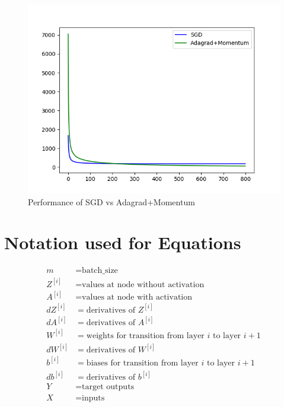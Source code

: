 \documentclass{article}
\begin{document}
\begin{figure}[H]
	\includegraphics[scale=0.5]{SGDAdagradplot.png}
	\caption{Performance of SGD vs Adagrad+Momentum}
\end{figure}

\appendix
\section{Notation used for Equations}
\begin{align*}
	m        & =\textrm{batch\_size}                                                  \\ 
	Z^{[i]}  & =\textrm{values at node without activation}                            \\
	A^{[i]}  & =\textrm{values at node with activation}                               \\
	dZ^{[i]} & =\textrm{derivatives of } Z^{[i]}                                      \\
	dA^{[i]} & =\textrm{derivatives of } A^{[i]}                                      \\
	W^{[i]}  & =\textrm{weights for transition from layer } i \textrm{ to layer } i+1 \\
	dW^{[i]} & =\textrm{derivatives of } W^{[i]}                                      \\
	b^{[i]}  & =\textrm{biases for transition from layer } i \textrm{ to layer } i+1  \\
	db^{[i]} & =\textrm{derivatives of } b^{[i]}                                      \\
	Y        & = \textrm{target outputs}                                              \\
	X        & = \textrm{inputs}                                                      \\
\end{align*}
\end{document}
